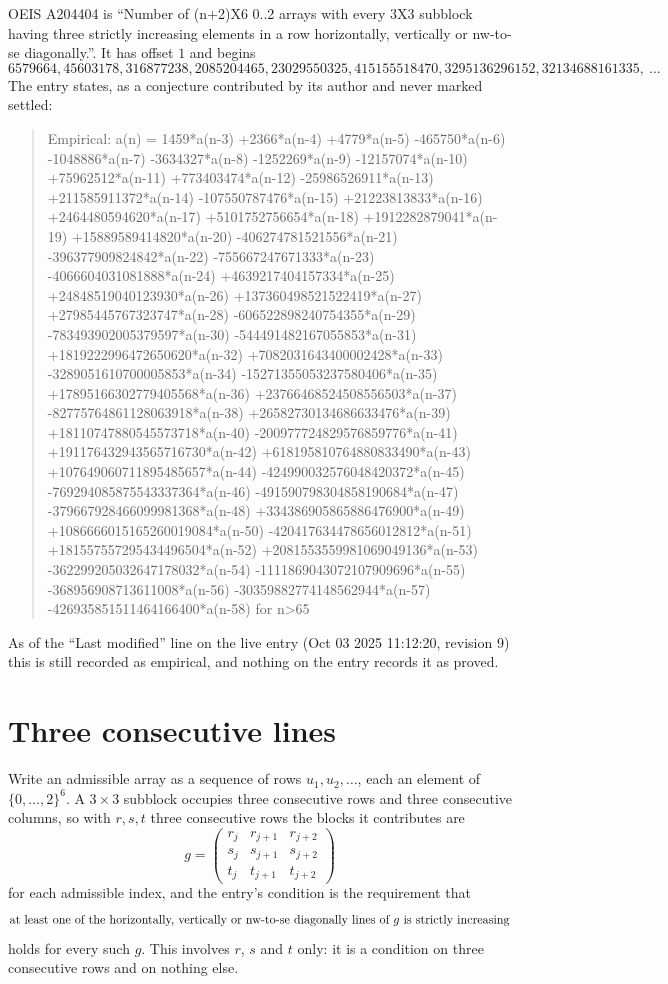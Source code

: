 \documentclass[11pt,a4paper]{article}
\theoremstyle{plain}
\theoremstyle{definition}
\begin{document}
OEIS A204404 is ``Number of (n+2)X6 0..2 arrays with every 3X3 subblock having three strictly increasing elements in a row horizontally, vertically or nw-to-se diagonally.''. It has offset $1$ and begins
\[
6579664, 45603178, 316877238, 2085204465, 23029550325, 415155518470, 3295136296152, 32134688161335,\ \dots
\]
The entry states, as a conjecture contributed by its author and never marked settled:
\begin{quote}
Empirical: a(n) = 1459*a(n-3) +2366*a(n-4) +4779*a(n-5) -465750*a(n-6) -1048886*a(n-7) -3634327*a(n-8) -1252269*a(n-9) -12157074*a(n-10) +75962512*a(n-11) +773403474*a(n-12) -25986526911*a(n-13) +211585911372*a(n-14) -107550787476*a(n-15) +21223813833*a(n-16) +2464480594620*a(n-17) +5101752756654*a(n-18) +1912282879041*a(n-19) +15889589414820*a(n-20) -406274781521556*a(n-21) -396377909824842*a(n-22) -755667247671333*a(n-23) -4066604031081888*a(n-24) +4639217404157334*a(n-25) +24848519040123930*a(n-26) +137360498521522419*a(n-27) +27985445767323747*a(n-28) -606522898240754355*a(n-29) -783493902005379597*a(n-30) -544491482167055853*a(n-31) +1819222996472650620*a(n-32) +7082031643400002428*a(n-33) -3289051610700005853*a(n-34) -15271355053237580406*a(n-35) +17895166302779405568*a(n-36) +23766468524508556503*a(n-37) -82775764861128063918*a(n-38) +26582730134686633476*a(n-39) +18110747880545573718*a(n-40) -200977724829576859776*a(n-41) +191176432943565716730*a(n-42) +618195810764880833490*a(n-43) +107649060711895485657*a(n-44) -424990032576048420372*a(n-45) -769294085875543337364*a(n-46) -491590798304858190684*a(n-47) -379667928466099981368*a(n-48) +334386905865886476900*a(n-49) +1086666015165260019084*a(n-50) -420417634478656012812*a(n-51) +181557557295434496504*a(n-52) +2081553559981069049136*a(n-53) -362299205032647178032*a(n-54) -1111869043072107909696*a(n-55) -368956908713611008*a(n-56) -30359882774148562944*a(n-57) -426935851511464166400*a(n-58) for n>65
\end{quote}
As of the ``Last modified'' line on the live entry (Oct 03 2025 11:12:20, revision 9) this is still
recorded as empirical, and nothing on the entry records it as proved.

\section{Three consecutive lines}

Write an admissible array as a sequence of rows $u_1,u_2,\dots$, each an element of
$\{0,\dots,2\}^{6}$. A $3\times3$ subblock occupies three consecutive rows and
three consecutive columns, so with $r,s,t$ three consecutive rows the blocks it
contributes are
\[
g=\begin{pmatrix}r_j&r_{j+1}&r_{j+2}\\ s_j&s_{j+1}&s_{j+2}\\ t_j&t_{j+1}&t_{j+2}\end{pmatrix}
\]
for each admissible index, and the entry's condition is the requirement that
\[
\text{at least one}\text{ of the horizontally, vertically or nw-to-se diagonally lines of }g\text{ \text{is strictly increasing}}
\]
holds for every such $g$. This involves $r$, $s$ and $t$ only: it is a condition on
three consecutive rows and on nothing else.
\end{document}
